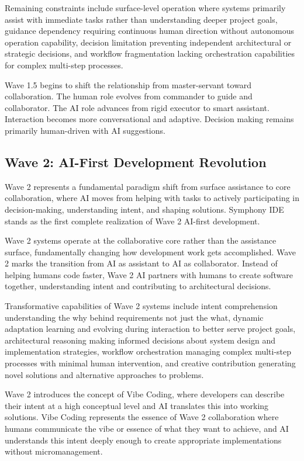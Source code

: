 Remaining constraints include surface-level operation where systems primarily assist with immediate tasks rather than understanding deeper project goals, guidance dependency requiring continuous human direction without autonomous operation capability, decision limitation preventing independent architectural or strategic decisions, and workflow fragmentation lacking orchestration capabilities for complex multi-step processes.

Wave 1.5 begins to shift the relationship from master-servant toward collaboration. The human role evolves from commander to guide and collaborator. The AI role advances from rigid executor to smart assistant. Interaction becomes more conversational and adaptive. Decision making remains primarily human-driven with AI suggestions.

\subsection{Wave 2: AI-First Development Revolution}

Wave 2 represents a fundamental paradigm shift from surface assistance to core collaboration, where AI moves from helping with tasks to actively participating in decision-making, understanding intent, and shaping solutions. Symphony IDE stands as the first complete realization of Wave 2 AI-first development.

Wave 2 systems operate at the collaborative core rather than the assistance surface, fundamentally changing how development work gets accomplished. Wave 2 marks the transition from AI as assistant to AI as collaborator. Instead of helping humans code faster, Wave 2 AI partners with humans to create software together, understanding intent and contributing to architectural decisions.

Transformative capabilities of Wave 2 systems include intent comprehension understanding the why behind requirements not just the what, dynamic adaptation learning and evolving during interaction to better serve project goals, architectural reasoning making informed decisions about system design and implementation strategies, workflow orchestration managing complex multi-step processes with minimal human intervention, and creative contribution generating novel solutions and alternative approaches to problems.

Wave 2 introduces the concept of Vibe Coding, where developers can describe their intent at a high conceptual level and AI translates this into working solutions. Vibe Coding represents the essence of Wave 2 collaboration where humans communicate the vibe or essence of what they want to achieve, and AI understands this intent deeply enough to create appropriate implementations without micromanagement.

